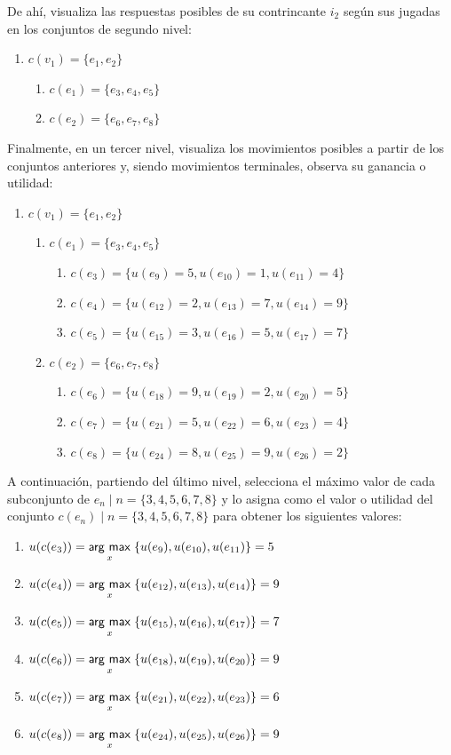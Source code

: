 De ahí, visualiza las respuestas posibles de su contrincante $i_{2}$ según sus jugadas en los conjuntos de segundo nivel: 
\begin{enumerate}
\item $c(v_{1}) = \{e_{1}, e_{2}\}$
	\begin{enumerate}
	\item $c(e_{1}) = \{e_{3}, e_{4}, e_{5}\}$ 
	\item $c(e_{2}) = \{e_{6}, e_{7}, e_{8}\}$
	\end{enumerate}
\end{enumerate}
Finalmente, en un tercer nivel, visualiza los movimientos posibles a partir de los conjuntos anteriores y, siendo movimientos terminales, observa su ganancia o utilidad: 
\begin{enumerate}
\item $c(v_{1}) = \{e_{1}, e_{2}\}$
	\begin{enumerate}
	\item $c(e_{1}) = \{e_{3}, e_{4}, e_{5}\}$ 
		\begin{enumerate}
		\item $c(e_{3}) = \{u(e_{9})=5, u(e_{10})=1, u(e_{11})=4 \}$
		\item $c(e_{4}) = \{u(e_{12})=2, u(e_{13})=7, u(e_{14})=9 \}$
		\item $c(e_{5}) = \{u(e_{15})=3, u(e_{16})=5, u(e_{17})=7 \}$
		\end{enumerate}
	\item $c(e_{2}) = \{e_{6}, e_{7}, e_{8}\}$
		\begin{enumerate}
		\item $c(e_{6}) = \{u(e_{18})=9, u(e_{19})=2, u(e_{20})=5 \}$
		\item $c(e_{7}) = \{u(e_{21})=5, u(e_{22})=6, u(e_{23})=4 \}$
		\item $c(e_{8}) = \{u(e_{24})=8, u(e_{25})=9, u(e_{26})=2 \}$
		\end{enumerate}
	\end{enumerate}
\end{enumerate}

A continuación, partiendo del último nivel, selecciona el máximo valor de cada subconjunto de $e_{n} \mid n = \{3,4,5,6,7,8\}$ y lo asigna como el valor o utilidad del conjunto $c(e_{n}) \mid n = \{3,4,5,6,7,8\}$ para obtener los siguientes valores:
		\begin{enumerate}
		\item $u(c(e_{3})) = \underset{x}{\operatorname{\mathsf{arg}}\,\operatorname{\mathsf{max}}}\; \{u(e_{9}), u(e_{10}),  u(e_{11})\}= 5 $
		\item $u(c(e_{4})) = \underset{x}{\operatorname{\mathsf{arg}}\,\operatorname{\mathsf{max}}}\; \{u(e_{12}), u(e_{13}), u(e_{14})\}=9 $
		\item $u(c(e_{5})) = \underset{x}{\operatorname{\mathsf{arg}}\,\operatorname{\mathsf{max}}}\; \{u(e_{15}), u(e_{16}), u(e_{17})\}= 7$
		\item $u(c(e_{6})) = \underset{x}{\operatorname{\mathsf{arg}}\,\operatorname{\mathsf{max}}}\; \{u(e_{18}), u(e_{19}), u(e_{20}) \}=9$
		\item $u(c(e_{7})) =  \underset{x}{\operatorname{\mathsf{arg}}\,\operatorname{\mathsf{max}}}\; \{u(e_{21}), u(e_{22}), u(e_{23}) \}=6 $
		\item $u(c(e_{8})) = \underset{x}{\operatorname{\mathsf{arg}}\,\operatorname{\mathsf{max}}}\; \{u(e_{24}), u(e_{25}), u(e_{26})\} = 9$
\end{enumerate}


